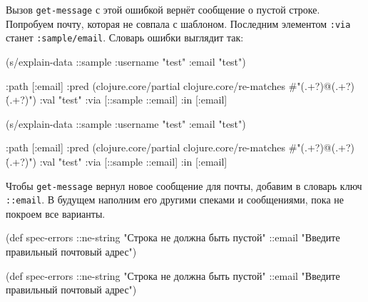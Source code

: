 \fi

Вызов \verb|get-message| с этой ошибкой вернёт сообщение о пустой
строке. Попробуем почту, которая не совпала с шаблоном. Последним элементом
\verb|:via| станет \verb|:sample/email|. Словарь ошибки выглядит так:

\ifx\DEVICETYPE\MOBILE

\begin{english}
  \begin{clojure}
(s/explain-data ::sample
  {:username "test" :email "test"})

{:path [:email]
 :pred
 (clojure.core/partial
  clojure.core/re-matches
  #"(.+?)@(.+?)\.(.+?)")
 :val "test"
 :via [::sample ::email]
 :in [:email]}
  \end{clojure}
\end{english}

\else

\begin{english}
  \begin{clojure}
(s/explain-data ::sample {:username "test" :email "test"})

{:path [:email]
 :pred
 (clojure.core/partial
  clojure.core/re-matches
  #"(.+?)@(.+?)\.(.+?)")
 :val "test"
 :via [::sample ::email]
 :in [:email]}
  \end{clojure}
\end{english}

\fi

Чтобы \verb|get-message| вернул новое сообщение для почты, добавим в словарь
ключ \verb|::email|. В будущем наполним его другими спеками и сообщениями, пока
не покроем все варианты.

\ifx\DEVICETYPE\MOBILE

  \begin{clojure}
(def spec-errors
  {::ne-string
   "Строка не должна быть пустой"
   ::email
   "Введите правильный почтовый адрес"})
  \end{clojure}

\else

  \begin{clojure}
(def spec-errors
  {::ne-string "Строка не должна быть пустой"
   ::email "Введите правильный почтовый адрес"})
  \end{clojure}

\fi

